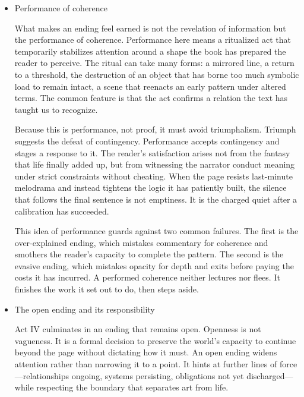 \documentclass[11pt]{article}
\begin{document}
\begin{itemize}
These gestures are not performative winks. They are structural signals that the text has learned. The ending becomes less a set of claims about the past and more a demonstration of the very capacities the book has been training: the ability to hold tension without panic, to choose frames explicitly, to count mediators accurately, to keep the nonhuman visible, to apportion credit and blame with proportionate care.
\item Performance of coherence
\label{sec:orgd48c13d}

What makes an ending feel earned is not the revelation of information but the performance of coherence. Performance here means a ritualized act that temporarily stabilizes attention around a shape the book has prepared the reader to perceive. The ritual can take many forms: a mirrored line, a return to a threshold, the destruction of an object that has borne too much symbolic load to remain intact, a scene that reenacts an early pattern under altered terms. The common feature is that the act confirms a relation the text has taught us to recognize.

Because this is performance, not proof, it must avoid triumphalism. Triumph suggests the defeat of contingency. Performance accepts contingency and stages a response to it. The reader’s satisfaction arises not from the fantasy that life finally added up, but from witnessing the narrator conduct meaning under strict constraints without cheating. When the page resists last-minute melodrama and instead tightens the logic it has patiently built, the silence that follows the final sentence is not emptiness. It is the charged quiet after a calibration has succeeded.

This idea of performance guards against two common failures. The first is the over-explained ending, which mistakes commentary for coherence and smothers the reader’s capacity to complete the pattern. The second is the evasive ending, which mistakes opacity for depth and exits before paying the costs it has incurred. A performed coherence neither lectures nor flees. It finishes the work it set out to do, then steps aside.
\item The open ending and its responsibility
\label{sec:org0918a2c}

Act IV culminates in an ending that remains open. Openness is not vagueness. It is a formal decision to preserve the world’s capacity to continue beyond the page without dictating how it must. An open ending widens attention rather than narrowing it to a point. It hints at further lines of force—relationships ongoing, systems persisting, obligations not yet discharged—while respecting the boundary that separates art from life.


\end{itemize}
\end{document}
